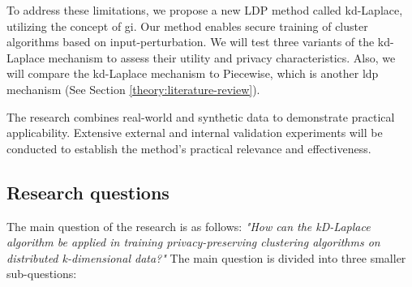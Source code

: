 To address these limitations, we propose a new LDP method called kd-Laplace, utilizing the concept of \gls{gi}.
Our method enables secure training of cluster algorithms based on input-perturbation.
We will test three variants of the kd-Laplace mechanism to assess their utility and privacy characteristics.
Also, we will compare the kd-Laplace mechanism to Piecewise, which is another \gls{ldp} mechanism (See Section \ref{theory:literature-review}).

The research combines real-world and synthetic data to demonstrate practical applicability.
Extensive external and internal validation experiments will be conducted to establish the method's practical relevance and effectiveness.

\subsection{Research questions}
The main question of the research is as follows: \newline \newline
\textit{"How can the kD-Laplace algorithm be applied in training privacy-preserving clustering algorithms on distributed k-dimensional data?"} \newline
The main question is divided into three smaller sub-questions:
